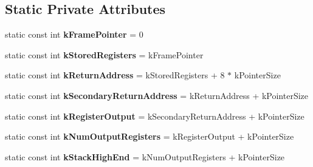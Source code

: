 \subsection*{Static Private Attributes}
\begin{DoxyCompactItemize}
\item 
static const int {\bfseries k\+Frame\+Pointer} = 0\hypertarget{classv8_1_1internal_1_1_reg_exp_macro_assembler_a_r_m_a280908b836384717eef847328b17b6b5}{}\label{classv8_1_1internal_1_1_reg_exp_macro_assembler_a_r_m_a280908b836384717eef847328b17b6b5}

\item 
static const int {\bfseries k\+Stored\+Registers} = k\+Frame\+Pointer\hypertarget{classv8_1_1internal_1_1_reg_exp_macro_assembler_a_r_m_a3607463f3b0116b482751781cf979922}{}\label{classv8_1_1internal_1_1_reg_exp_macro_assembler_a_r_m_a3607463f3b0116b482751781cf979922}

\item 
static const int {\bfseries k\+Return\+Address} = k\+Stored\+Registers + 8 $\ast$ k\+Pointer\+Size\hypertarget{classv8_1_1internal_1_1_reg_exp_macro_assembler_a_r_m_a5b6169f5081bcdbca4b16ebbe39f596f}{}\label{classv8_1_1internal_1_1_reg_exp_macro_assembler_a_r_m_a5b6169f5081bcdbca4b16ebbe39f596f}

\item 
static const int {\bfseries k\+Secondary\+Return\+Address} = k\+Return\+Address + k\+Pointer\+Size\hypertarget{classv8_1_1internal_1_1_reg_exp_macro_assembler_a_r_m_a5ad7249c56c19d0dab7129915f9c80db}{}\label{classv8_1_1internal_1_1_reg_exp_macro_assembler_a_r_m_a5ad7249c56c19d0dab7129915f9c80db}

\item 
static const int {\bfseries k\+Register\+Output} = k\+Secondary\+Return\+Address + k\+Pointer\+Size\hypertarget{classv8_1_1internal_1_1_reg_exp_macro_assembler_a_r_m_afb5bdbd36939873fdbdd916d7c076086}{}\label{classv8_1_1internal_1_1_reg_exp_macro_assembler_a_r_m_afb5bdbd36939873fdbdd916d7c076086}

\item 
static const int {\bfseries k\+Num\+Output\+Registers} = k\+Register\+Output + k\+Pointer\+Size\hypertarget{classv8_1_1internal_1_1_reg_exp_macro_assembler_a_r_m_a6accce619399a1c4af7be425568afc89}{}\label{classv8_1_1internal_1_1_reg_exp_macro_assembler_a_r_m_a6accce619399a1c4af7be425568afc89}

\item 
static const int {\bfseries k\+Stack\+High\+End} = k\+Num\+Output\+Registers + k\+Pointer\+Size\hypertarget{classv8_1_1internal_1_1_reg_exp_macro_assembler_a_r_m_a542a73e30c5208f5443c85a7525c7586}{}\label{classv8_1_1internal_1_1_reg_exp_macro_assembler_a_r_m_a542a73e30c5208f5443c85a7525c7586}


\end{DoxyCompactItemize}
